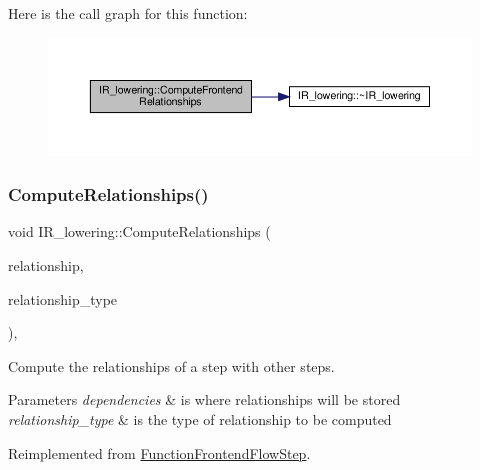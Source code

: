 Here is the call graph for this function\+:
\nopagebreak
\begin{figure}[H]
\begin{center}
\leavevmode
\includegraphics[width=350pt]{df/d7d/classIR__lowering_a071c0cd6fc3ab02d7c7581426abe47a4_cgraph}
\end{center}
\end{figure}
\mbox{\label{classIR__lowering_a47d1e16e6d42ddac272d166329013fd4}} 
\subsubsection{\texorpdfstring{Compute\+Relationships()}{ComputeRelationships()}}
{\footnotesize\ttfamily void I\+R\+\_\+lowering\+::\+Compute\+Relationships (\begin{DoxyParamCaption}\item[{\hyperlink{classDesignFlowStepSet}{Design\+Flow\+Step\+Set} \&}]{relationship,  }\item[{const \hyperlink{classDesignFlowStep_a723a3baf19ff2ceb77bc13e099d0b1b7}{Design\+Flow\+Step\+::\+Relationship\+Type}}]{relationship\+\_\+type }\end{DoxyParamCaption})\hspace{0.3cm}{\ttfamily [override]}, {\ttfamily [virtual]}}



Compute the relationships of a step with other steps. 


\begin{DoxyParams}{Parameters}
{\em dependencies} & is where relationships will be stored \\
\hline
{\em relationship\+\_\+type} & is the type of relationship to be computed \\
\hline
\end{DoxyParams}


Reimplemented from \hyperlink{classFunctionFrontendFlowStep_a1a815ea7885f3e92e414dadd40c43cba}{Function\+Frontend\+Flow\+Step}.



